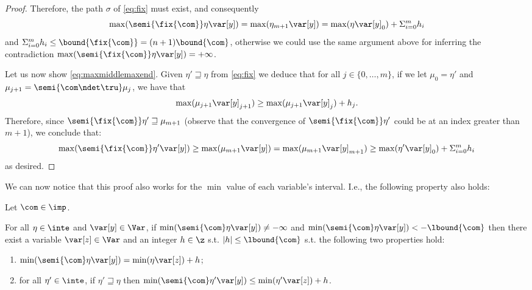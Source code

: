 \begin{proof}
  \noindent
  Therefore, the path \(\sigma\) of \eqref{eq:fix} must exist, and
  consequently
  \[\max(\semi{\fix{\com}} \eta \var[y]) = \max(\eta_{m+1} \var[y]) =
    \max(\eta \var[y]_0) + \Sigma_{i=0}^m h_i\] and
  \(\Sigma_{i=0}^m h_i \leq \bound{\fix{\com}}=(n+1)\bound{\com}\),
  otherwise we could use the same argument above for inferring the
  contradiction \(\max(\semi{\fix{\com}} \eta \var[y]) = +\infty\).

  \medskip

  Let us now show \eqref{eq:maxmiddlemaxend}. Given
  \(\eta' \sqsupseteq \eta\) from \eqref{eq:fix} we deduce that for
  all \(j \in \{ 0, \ldots, m\}\), if we let \(\mu_0 = \eta'\) and
  \(\mu_{j+1} = \semi{\com \ndet \tru} \mu_j\), we have that
  \[
    \max(\mu_{j+1} \var[y]_{j+1}) \geq \max(\mu_{j+1} \var[y]_{j}) +
    h_j. \]
  Therefore, since \(\semi{\fix{\com}} \eta' \sqsupseteq \mu_{m+1}\)
  (observe that the convergence of \(\semi{\fix{\com}} \eta' \) could
  be at an index greater than \(m+1\)), we conclude that:
  \[\max(\semi{\fix{\com}} \eta' \var[y]) \geq \max(\mu_{m+1}
  \var[y]) = \max(\mu_{m+1} \var[y]_{m+1}) \geq \max(\eta' \var[y]_0)
  + \Sigma_{i=0}^m h_i\] as desired.
\end{proof}

We can now notice that this proof also works for the \(\min\) value of
each variable's interval. I.e., the following property also holds:

\begin{corollary}\label{co:inc}
  Let \(\com \in \imp\).
  
  \noindent
  For all \(\eta \in \inte\) and
  \(\var[y] \in \Var\), if
  \(\min(\semi{\com}\eta\var[y]) \neq -\infty\) and
  \(\min(\semi{\com}\eta\var[y]) < -\lbound{\com}\) then there exist a
  variable \(\var[z] \in\Var\) and an integer \(h \in \z\) s.t.
  \(|h| \leq \lbound{\com}\) s.t. the following two properties hold:
  
  \begin{enumerate}[label=(\roman*)]
  \item \(\min(\semi{\com}\eta \var[y]) = \min(\eta \var[z]) + h\); \label{point1min}
  \item  for all \(\eta' \in \inte\), if \(\eta' \sqsupseteq \eta\)
    then
    \(\min(\semi{\com}\eta' \var[y]) \leq \min(\eta' \var[z]) + h\). \label{point2min}
  \end{enumerate}
\end{corollary}

